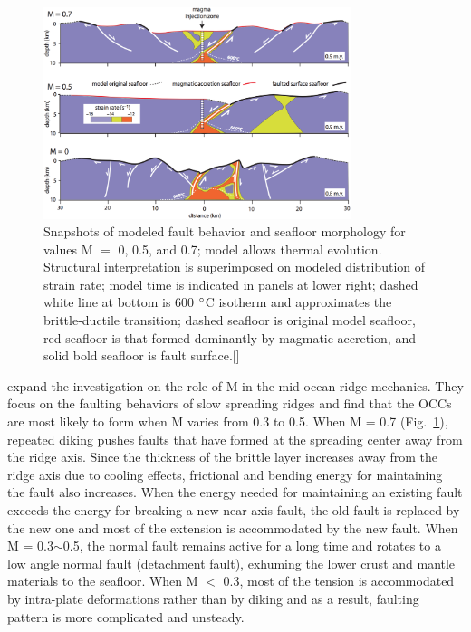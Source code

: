 \begin{figure}[h]
 \centering
  \includegraphics[width=0.8\textwidth]{./Figures/fig_Intro_Tucholke2008.eps}
 \caption{Snapshots of modeled fault behavior and seafloor morphology for values M $=$ 0, 0.5, and 0.7; model allows thermal evolution. Structural interpretation is superimposed on modeled distribution of strain rate; model time is indicated in panels at lower right; dashed white line at bottom is 600 $\degree$C isotherm and approximates the brittle-ductile transition; dashed seafloor is original model seafloor, red seafloor is that formed dominantly by magmatic accretion, and solid bold seafloor is fault surface.[\citealp{Tucholke2008,Whitney2012}]}
 \label{fig_Intro6_1}
\end{figure}

\citet{Tucholke2008} expand the investigation on the role of M in the mid-ocean ridge mechanics. They focus on the faulting behaviors of slow spreading ridges and find that the OCCs are most likely to form when M varies from 0.3 to 0.5. When M = 0.7 (Fig.~\ref{fig_Intro6_1}), repeated diking pushes faults that have formed at the spreading center away from the ridge axis. Since the thickness of the brittle layer increases away from the ridge axis due to cooling effects, frictional and bending energy for maintaining the fault also increases. When the energy needed for maintaining an existing fault exceeds the energy for breaking a new near-axis fault, the old fault is replaced by the new one and most of the extension is accommodated by the new fault. When M = 0.3$\sim$0.5, the normal fault remains active for a long time and rotates to a low angle normal fault (detachment fault), exhuming the lower crust and mantle materials to the seafloor. When M $<$ 0.3, most of the tension is accommodated by intra-plate deformations rather than by diking and as a result, faulting pattern is more complicated and unsteady.

